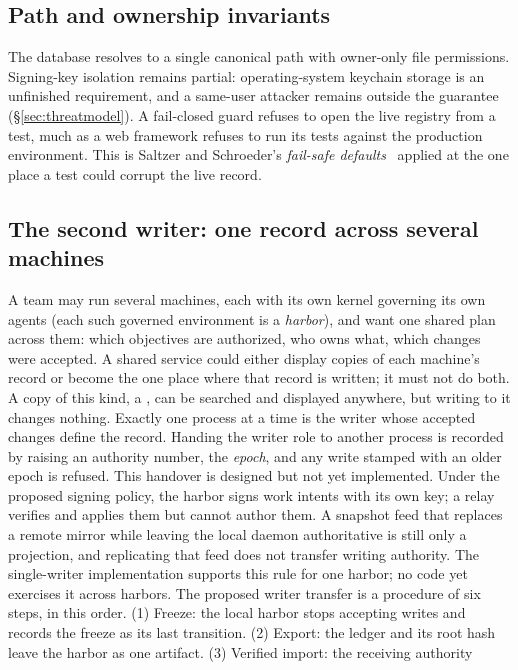 \documentclass[11pt,a4paper]{article}
\theoremstyle{definition}
\theoremstyle{remark}
\begin{document}
\subsection{Path and ownership invariants}
The database resolves to a single canonical path with owner-only file permissions.
Signing-key isolation remains partial: operating-system keychain storage is an
unfinished requirement, and a same-user attacker remains outside the guarantee
(\S\ref{sec:threatmodel}). A fail-closed guard refuses to open the live registry
from a test, much as a web framework refuses to run its tests against the
production environment. This is Saltzer and Schroeder's \emph{fail-safe
defaults}~ applied at the one place a test could
corrupt the live record.
\subsection{The second writer: one record across several machines}
\label{sec:second-writer}
A team may run several machines, each with its own kernel governing its own
agents (each such governed environment is a \emph{harbor}), and want one shared
plan across them: which objectives are authorized, who owns what, which
changes were accepted. A shared service could either display copies of each
machine's record or become the one place where that record is written; it must
not do both. A copy of this kind, a , can be searched and
displayed anywhere, but writing to it changes nothing. Exactly one process at a
time is the writer whose accepted changes define the record. Handing the writer
role to another process is recorded by raising an authority number, the
\emph{epoch}, and any write stamped with an older epoch is refused. This
handover is designed but not yet implemented.
Under the proposed signing policy, the harbor signs work intents with its own
key; a relay verifies and applies them but cannot author them. A snapshot feed
that replaces a remote mirror while leaving the local daemon authoritative is
still only a projection, and replicating that feed does not transfer writing
authority. The single-writer implementation supports this rule for one harbor;
no code yet exercises it across harbors.
The proposed writer transfer is a procedure of six steps, in this order. (1) Freeze: the local harbor stops accepting writes and records the
freeze as its last transition. (2) Export: the ledger and its root hash leave
the harbor as one artifact. (3) Verified import: the receiving authority
\end{document}
